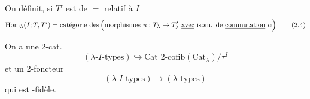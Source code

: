 \documentclass[11pt,a4paper]{article}
\begin{document}
On définit, si $T'$ est de $=$ relatif à $I$
\begin{equation}
  \mathrm{Hom}_{\lambda}(I; T, T') = \text{catégorie des}
  \left(\text{morphismes } u : T_{\lambda} \to T'_{\lambda}
  \ \struck{\text{avec}}\ \text{isom. de } \struck{\text{commutation}}\ \alpha\right)
  \tag{2.4}
\end{equation}


On a une  2-cat.
\begin{equation}
  (\lambda\text{-}I\text{-types}) \hookrightarrow
  \text{Cat 2-cofib}(\mathrm{Cat}_{\lambda})/\tau^{I}
  \tag{2.5}
\end{equation}
et un 2-foncteur
\begin{equation}
  (\lambda\text{-}I\text{-types}) \longrightarrow (\lambda\text{-types})
  \tag{2.6}
\end{equation}
 qui est \ill{}-fidèle.
\end{document}
